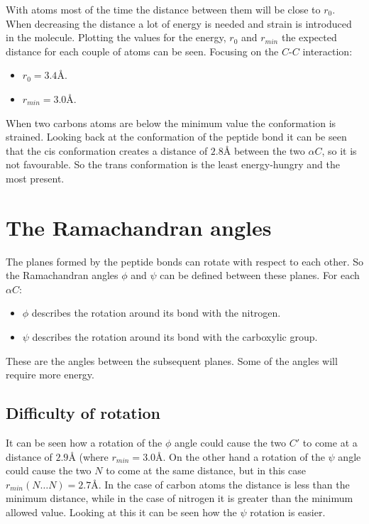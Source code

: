	With atoms most of the time the distance between them will be close to $r_0$.
	When decreasing the distance a lot of energy is needed and strain is introduced in the molecule.
	Plotting the values for the energy, $r_0$ and $r_{min}$ the expected distance for each couple of atoms can be seen.
	Focusing on the $C$-$C$ interaction:

	\begin{multicols}{2}
		\begin{itemize}
			\item $r_0 = 3.4\si{\angstrom}$.
			\item $r_{min} = 3.0\si{\angstrom}$.
		\end{itemize}
	\end{multicols}

	When two carbons atoms are below the minimum value the conformation is strained.
	Looking back at the conformation of the peptide bond it can be seen that the cis conformation creates a distance of $2.8\si{\angstrom}$ between the two $\alpha C$, so it is not favourable.
	So the trans conformation is the least energy-hungry and the most present.

\section{The Ramachandran angles}
The planes formed by the peptide bonds can rotate with respect to each other.
So the Ramachandran angles $\phi$ and $\psi$ can be defined between these planes.
For each $\alpha C$:

\begin{multicols}{2}
	\begin{itemize}
		\item $\phi$ describes the rotation around its bond with the nitrogen.
		\item $\psi$ describes the rotation around its bond with the carboxylic group.
	\end{itemize}
\end{multicols}

These are the angles between the subsequent planes.
Some of the angles will require more energy.

	\subsection{Difficulty of rotation}
	It can be seen how a rotation of the $\phi$ angle could cause the two $C'$ to come at a distance of $2.9\si{\angstrom}$ (where $r_{min} = 3.0\si{\angstrom}$.
	On the other hand a rotation of the $\psi$ angle could cause the two $N$ to come at the same distance, but in this case $r_{min}(N\dots N) = 2.7\si{\angstrom}$.
	In the case of carbon atoms the distance is less than the minimum distance, while in the case of nitrogen it is greater than the minimum allowed value.
	Looking at this it can be seen how the $\psi$ rotation is easier.

